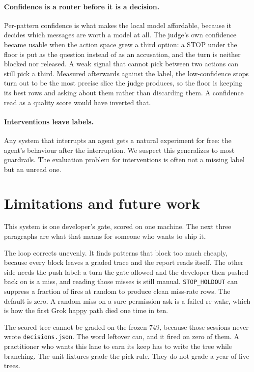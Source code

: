 \paragraph{Confidence is a router before it is a decision.} Per-pattern
confidence is what makes the local model affordable, because it decides which
messages are worth a model at all. The judge's own confidence became usable
when the action space grew a third option: a STOP under the floor is put as
the question instead of as an accusation, and the turn is neither blocked nor
released. A weak signal that cannot pick between two actions can still pick a
third. Measured afterwards against the label, the low-confidence stops turn
out to be the most precise slice the judge produces, so the floor is keeping
its best rows and asking about them rather than discarding them. A confidence
read as a quality score would have inverted that.

\paragraph{Interventions leave labels.} Any system that interrupts an agent gets
a natural experiment for free: the agent's behaviour after the interruption. We
suspect this generalizes to most guardrails. The evaluation problem for
interventions is often not a missing label but an unread one.

\section{Limitations and future work}

This system is one developer's gate, scored on one machine. The next
three paragraphs are what that means for someone who wants to ship it.

The loop corrects unevenly. It finds patterns that block too much cheaply,
because every block leaves a graded trace and the report reads itself. The
other side needs the push label: a turn the gate allowed and the developer then
pushed back on is a miss, and reading those misses is still manual.
\texttt{STOP\_HOLDOUT} can suppress a fraction of fires at random to produce
clean miss-rate rows. The default is zero. A random miss on a sure
permission-ask is a failed re-wake, which is how the first Grok happy path
died one time in ten.

The scored tree cannot be graded on the frozen 749, because those
sessions never wrote \texttt{decisions.json}. The word leftover can,
and it fired on zero of them. A practitioner who wants this lane
to earn its keep has to write the tree while branching. The unit
fixtures grade the pick rule. They do not grade a year of live
trees.

